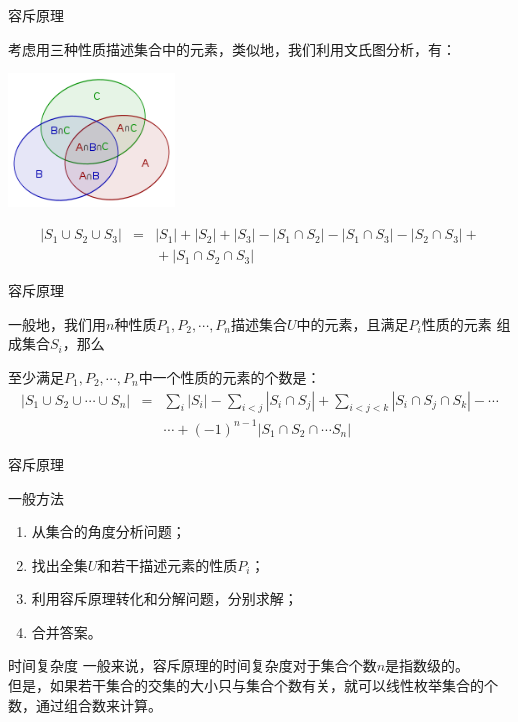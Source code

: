 \documentclass[allowframebreaks,9pt]{beamer}
\begin{document}
\begin{frame}{容斥原理}

考虑用三种性质描述集合中的元素，类似地，我们利用文氏图分析，有：
\begin{center}
\includegraphics[height=100pt]{venn_1.png}
\end{center}
\begin{eqnarray*}
|S_1 \cup S_2 \cup S_3| & = & |S_1| + |S_2| + |S_3| - |S_1 \cap S_2| - |S_1 \cap S_3| - |S_2 \cap S_3| +{} \\
                        &   & {}+ |S_1 \cap S_2 \cap S_3|
\end{eqnarray*}

\end{frame}

\begin{frame}{容斥原理}

一般地，我们用$n$种性质$P_1,P_2,\cdots,P_n$描述集合$U$中的元素，且满足$P_i$性质的元素
组成集合$S_i$，那么

\begin{theorem}
至少满足$P_1,P_2,\cdots,P_n$中一个性质的元素的个数是：
\begin{eqnarray*}
|S_1 \cup S_2 \cup \cdots \cup S_n| & = & \sum_{i}{|S_i|} - \sum_{i<j}{|S_i \cap S_j|} + \sum_{i<j<k}{|S_i \cap S_j \cap S_k|} - \cdots{} \\
                                    &   & {}\cdots + (-1)^{n-1}{|S_1 \cap S_2 \cap \cdots S_n|}
\end{eqnarray*}
\end{theorem}

\end{frame}

\begin{frame}{容斥原理}

\begin{block}{一般方法}
\begin{enumerate}
\item 从{\color{red}集合}的角度分析问题；
\item 找出全集$U$和若干描述元素的性质$P_i$；
\item 利用容斥原理{\color{red}转化}和{\color{red}分解}问题，分别求解；
\item 合并答案。
\end{enumerate}
\end{block}

\pause

\begin{block}{时间复杂度}
一般来说，容斥原理的时间复杂度对于集合个数$n$是指数级的。 \\
但是，如果若干集合的交集的大小只与集合个数有关，就可以线性枚举集合的个数，通过组合数来计算。
\end{block}

\end{frame}
\end{document}
